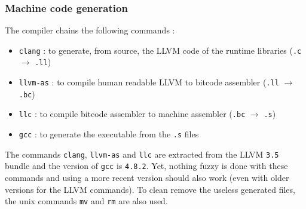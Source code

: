 \documentclass[a4paper,11pt]{article}
\begin{document}
\subsubsection{Machine code generation}
The compiler chains the following commands :
\begin{itemize}
	\item \texttt{clang} : to generate, from source, the LLVM code of the runtime libraries (\texttt{.c} $\rightarrow$ \texttt{.ll})
	\item \texttt{llvm-as} : to compile human readable LLVM to bitcode assembler (\texttt{.ll} $\rightarrow$ \texttt{.bc})
	\item \texttt{llc} : to compile bitcode assembler to machine assembler (\texttt{.bc} $\rightarrow$ \texttt{.s})
	\item \texttt{gcc} : to generate the executable from the \texttt{.s} files
\end{itemize}
The commands \texttt{clang}, \texttt{llvm-as} and \texttt{llc} are extracted from the LLVM \texttt{3.5} bundle and the version of \texttt{gcc} is \texttt{4.8.2}. Yet, nothing fuzzy is done with these commands and using a more recent version should also work (even with older versions for the LLVM commands).
To clean remove the useless generated files, the unix commands \texttt{mv} and \texttt{rm} are also used.
\end{document}
